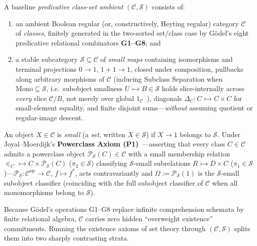 \begin{definition}\label{def:small-map-ambient}%
%
A baseline \emph{predicative class-set ambient} $(\mathcal{C}, \mathcal{S})$ consists of:
\begin{enumerate}
  \item an ambient Boolean regular (or, constructively, Heyting regular) category $\mathcal{C}$ of \emph{classes}, finitely generated in the two-sorted set/class case by G\"odel's eight predicative relational combinators \textbf{G1--G8}; and
  \item a stable subcategory $\mathcal{S} \subseteq \mathcal{C}$ of \emph{small maps} containing isomorphisms and terminal projections $0 \to 1$, $1 + 1 \to 1$, closed under composition, pullbacks along arbitrary morphisms of $\mathcal{C}$ (inducing Subclass Separation when $\mathrm{Mono} \subseteq \mathcal{S}$, i.e.\ subobject smallness $U \rightarrowtail B \in \mathcal{S}$ holds slice-internally across \emph{every} slice $\mathcal{C}/B$, not merely over global $1_{\mathcal{C}}$~\cite[\S I.1]{JoyalMoerdijk95}), diagonals $\Delta_C : C \rightarrowtail C \times C$ for small-element equality, and finite disjoint sums---\emph{without} assuming quotient or regular-image descent.
\end{enumerate}
An object $X \in \mathcal{C}$ is \emph{small} (a \emph{set}, written $X \in \mathcal{S}$) if $X \to 1$ belongs to $\mathcal{S}$. Under Joyal--Moerdijk's \textbf{Powerclass Axiom (P1)}~\cite[\S I.1]{JoyalMoerdijk95}---asserting that every class $C \in \mathcal{C}$ admits a powerclass object $\mathcal{P}_{\mathcal{S}}(C) \in \mathcal{C}$ with a small membership relation $\in_C \rightarrowtail C \times \mathcal{P}_{\mathcal{S}}(C)$ ($\pi_2 \in \mathcal{S}$) classifying $\mathcal{S}$-small subrelations $R \rightarrowtail D \times C$ ($\pi_1 \in \mathcal{S}$)---$\mathcal{P}_{\mathcal{S}} : \mathcal{C}^{\mathrm{op}} \to \mathcal{C}$, $f \mapsto f^*$, acts contravariantly and $\Omega := \mathcal{P}_{\mathcal{S}}(1)$ is the $\mathcal{S}$-small subobject classifier (coinciding with the full subobject classifier of $\mathcal{C}$ when all monomorphisms belong to $\mathcal{S}$).
\end{definition}

Because G\"odel's operations G1--G8 replace infinite comprehension schemata by finite relational algebra, $\mathcal{C}$ carries zero hidden ``overweight existence'' commitments. Running the existence axioms of set theory through $(\mathcal{C}, \mathcal{S})$ splits them into two sharply contrasting strata.

